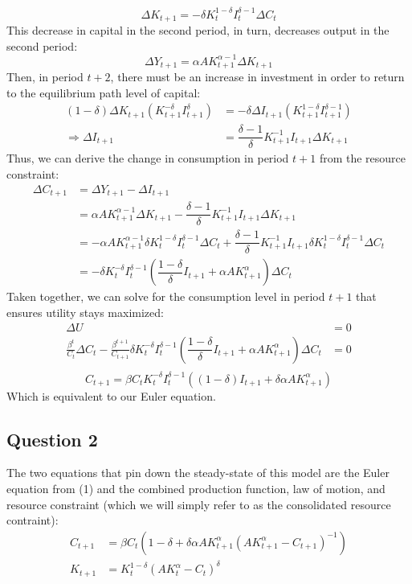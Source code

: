 \documentclass{article}
\begin{document}
\[
	\Delta K_{t+1} = -\delta K_t^{1-\delta}I_t^{\delta-1}\Delta C_t
\]
This decrease in capital in the second period, in turn, decreases output in the second period:
\[
	\Delta Y_{t+1} = \alpha A K^{\alpha-1}_{t+1}\Delta K_{t+1}
\]
Then, in period $t+2$, there must be an increase in investment in order to return to the equilibrium path level of capital:
\begin{align*}
	(1-\delta)\Delta K_{t+1}(K_{t+1}^{-\delta}I_{t+1}^\delta) &= -\delta\Delta I_{t+1}(K_{t+1}^{1-\delta}I_{t+1}^{\delta-1})	\\
	\Rightarrow \Delta I_{t+1} &= \dfrac{\delta-1}{\delta}K_{t+1}^{-1}I_{t+1}\Delta K_{t+1}
\end{align*}
Thus, we can derive the change in consumption in period $t+1$ from the resource constraint:
\begin{align*}
	\Delta C_{t+1} 	&= \Delta Y_{t+1} - \Delta I_{t+1} 																						\\
					&= \alpha A K^{\alpha-1}_{t+1}\Delta K_{t+1} - \dfrac{\delta-1}{\delta}K_{t+1}^{-1}I_{t+1}\Delta K_{t+1}				\\
					&= -\alpha A K^{\alpha-1}_{t+1}\delta K_t^{1-\delta}I_t^{\delta-1}\Delta C_t 
						+ \dfrac{\delta-1}{\delta}K_{t+1}^{-1}I_{t+1}\delta K_t^{1-\delta}I_t^{\delta-1}\Delta C_t							\\
					&= -\delta K_t^{-\delta}I_t^{\delta-1}\left(\dfrac{1-\delta}{\delta}I_{t+1}+\alpha A K^{\alpha}_{t+1}\right)\Delta C_t
\end{align*}
Taken together, we can solve for the consumption level in period $t+1$ that ensures utility stays maximized:
\begin{align*}
	\Delta U 																																			&= 0	\\
	\frac{\beta^t}{C_t}\Delta C_t - 
		\frac{\beta^{t+1}}{C_{t+1}}\delta K_t^{-\delta}I_t^{\delta-1}\left(\dfrac{1-\delta}{\delta}I_{t+1}+\alpha A K^{\alpha}_{t+1}\right)\Delta C_t 	&= 0	\\
\end{align*}
\[
	C_{t+1} = \beta C_t K_t^{-\delta}I_t^{\delta-1}\left((1-\delta)I_{t+1}+\delta\alpha A K^{\alpha}_{t+1}\right)	
\]
Which is equivalent to our Euler equation.


\subsection*{Question 2}
The two equations that pin down the steady-state of this model are the Euler equation from (1) and the combined production function, law of motion, and resource constraint (which we will simply refer to as the consolidated resource contraint):
\begin{align*}
	C_{t+1} &= \beta C_t\left(1-\delta+\delta\alpha AK^\alpha_{t+1}\left(AK_{t+1}^\alpha - C_{t+1}\right)^{-1}\right)	\\
	K_{t+1} &= K_t^{1-\delta}\left(AK_t^\alpha - C_t\right)^\delta
\end{align*}
\end{document}
